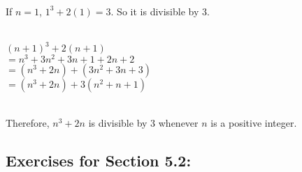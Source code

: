 \documentclass[12pt]{article}  %
\begin{document}
\\
If $n=1$, $1^3+2(1)=3$. So it is divisible by 3.

\\
$(n+1)^3+2(n+1)$\\
$=n^3+3n^2+3n+1+2n+2$\\
$=(n^3+2n)+(3n^2+3n+3)$\\
$=(n^3+2n)+3(n^2+n+1)$

\\
Therefore, $n^3+2n$ is divisible by 3 whenever $n$ is a positive integer.

\clearpage
\subsection*{Exercises for Section 5.2:}     
\end{document}
